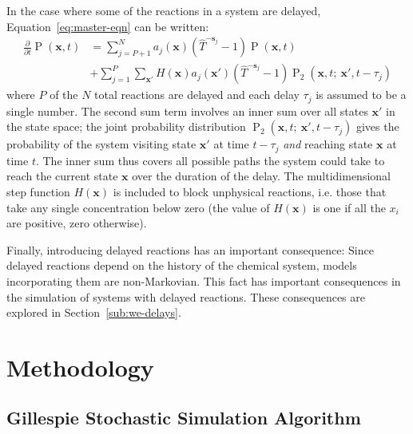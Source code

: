 \documentclass[english,letterpaper,12pt]{article}
\renewcommand{\vec}[1]{\ensuremath{\mathbf{#1}}}
\DeclareMathOperator{\Prob}{P}
\newcommand{\delaytime}{\ensuremath{\tau}}
\begin{document}
\begin{doublespacing}
In the case where some of the reactions in a system are delayed, Equation~\eqref{eq:master-eqn} can be written:
\begin{align}
    \frac{\partial}{\partial t} \Prob(\vec{x}, t) &= \sum_{j=P+1}^N a_j(\vec{x})(\hat{T}^{-\vec{s}_j} - 1)\Prob(\vec{x}, t) \\
                                                  &+ \sum_{j=1}^P \sum_{\vec{x}'} H(\vec{x}) a_j(\vec{x}') (\hat{T}^{-\vec{s}_j} - 1) \Prob_2(\vec{x}, t;\: \vec{x}', t - \delaytime_j)
    \label{eq:master-eqn-delay}
\end{align}
where $P$ of the $N$ total reactions are delayed and each delay $\delaytime_j$ is assumed to be a single number. The second sum term involves an inner sum over all states $\vec{x}'$ in the state space; the joint probability distribution $\Prob_2(\vec{x}, t;\: \vec{x}', t - \delaytime_j)$ gives the probability of the system visiting state $\vec{x}'$ at time $t - \delaytime_j$ \emph{and} reaching state $\vec{x}$ at time $t$. The inner sum thus covers all possible paths the system could take to reach the current state $\vec{x}$ over the duration of the delay. The multidimensional step function $H(\vec{x})$ is included to block unphysical reactions, i.e. those that take any single concentration below zero (the value of $H(\vec{x})$ is one if all the $x_i$ are positive, zero otherwise). 

Finally, introducing delayed reactions has an important consequence: Since delayed reactions depend on the history of the chemical system, models incorporating them are non-Markovian. This fact has important consequences in the simulation of systems with delayed reactions. These consequences are explored in Section~\ref{sub:we-delays}.



\section{Methodology} %
\label{sec:methodology}

\subsection{Gillespie Stochastic Simulation Algorithm} %
\label{sub:gillespie-ssa}


\end{doublespacing}
\end{document}
